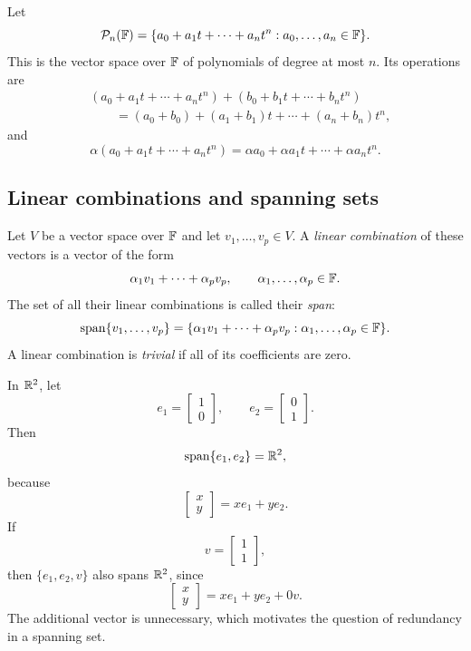 \begin{example}
  Let
  \[
    \mathcal P_n(\mathbb{F})
    =\{a_0+a_1t+\cdots+a_nt^n:a_0,\ldots,a_n\in\mathbb{F}\}.
  \]
  This is the vector space over $\mathbb{F}$ of polynomials of degree at most
  $n$. Its operations are
  \begin{align*}
    &(a_0+a_1t+\cdots+a_nt^n)
      +(b_0+b_1t+\cdots+b_nt^n)\\
    &\qquad=(a_0+b_0)+(a_1+b_1)t+\cdots+(a_n+b_n)t^n,
  \end{align*}
  and
  \[
    \alpha(a_0+a_1t+\cdots+a_nt^n)
    =\alpha a_0+\alpha a_1t+\cdots+\alpha a_nt^n.
  \]
\end{example}

\subsection{Linear combinations and spanning sets}

\begin{definition}
  Let $V$ be a vector space over $\mathbb{F}$ and let
  $v_1,\ldots,v_p\in V$. A \emph{linear combination} of these vectors is
  a vector of the form
  \[
    \alpha_1v_1+\cdots+\alpha_pv_p,
    \qquad
    \alpha_1,\ldots,\alpha_p\in\mathbb{F}.
  \]
  The set of all their linear combinations is called their \emph{span}:
  \[
    \operatorname{span}\{v_1,\ldots,v_p\}
    =\{\alpha_1v_1+\cdots+\alpha_pv_p:
      \alpha_1,\ldots,\alpha_p\in\mathbb{F}\}.
  \]
  A linear combination is \emph{trivial} if all of its coefficients are
  zero.
\end{definition}

In $\mathbb{R}^2$, let
\[
  e_1=\begin{bmatrix}1\\0\end{bmatrix},
  \qquad
  e_2=\begin{bmatrix}0\\1\end{bmatrix}.
\]
Then
\[
  \operatorname{span}\{e_1,e_2\}=\mathbb{R}^2,
\]
because
\[
  \begin{bmatrix}x\\y\end{bmatrix}=xe_1+ye_2.
\]
If
\[
  v=\begin{bmatrix}1\\1\end{bmatrix},
\]
then $\{e_1,e_2,v\}$ also spans $\mathbb{R}^2$, since
\[
  \begin{bmatrix}x\\y\end{bmatrix}=xe_1+ye_2+0v.
\]
The additional vector is unnecessary, which motivates the question of
redundancy in a spanning set.

